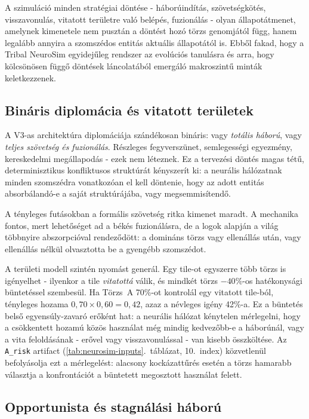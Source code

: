 ﻿\documentclass[a4paper,12pt]{report}
\begin{document}
A szimuláció minden stratégiai döntése - háborúindítás, szövetségkötés, visszavonulás,
vitatott területre való belépés, fuzionálás - olyan állapotátmenet, amelynek kimenetele
nem pusztán a döntést hozó törzs genomjától függ, hanem legalább annyira a szomszédos
entitás aktuális állapotától is. Ebből fakad, hogy a Tribal NeuroSim egyidejűleg
rendszer az evolúciós tanulásra és arra, hogy kölcsönösen függő döntések láncolatából
emergáló makroszintű minták keletkezzenek.

\subsection*{Bináris diplomácia és vitatott területek}

A V3-as architektúra diplomáciája szándékosan bináris: vagy \textit{totális háború},
vagy \textit{teljes szövetség és fuzionálás}. Részleges fegyverszünet, semlegességi
egyezmény, kereskedelmi megállapodás - ezek nem léteznek. Ez a tervezési döntés
magas tétű, determinisztikus konfliktusos struktúrát kényszerít ki: a neurális hálózatnak
minden szomszédra vonatkozóan el kell döntenie, hogy az adott entitás absorbálandó-e
a saját struktúrájába, vagy megsemmisítendő.

A tényleges futásokban a formális szövetség ritka kimenet maradt. A mechanika
fontos, mert lehetőséget ad a békés fuzionálásra, de a logok alapján a világ
többnyire abszorpcióval rendeződött: a domináns törzs vagy ellenállás után,
vagy ellenállás nélkül olvasztotta be a gyengébb szomszédot.

A területi modell szintén nyomást generál. Egy tile-ot egyszerre több törzs is igényelhet -
ilyenkor a tile \textit{vitatottá} válik, és mindkét törzs $-40\%$-os hatékonysági
büntetéssel szembesül. Ha Törzs~A 70\%-ot kontrolál egy vitatott tile-ból, tényleges
hozama $0{,}70 \times 0{,}60 = 0{,}42$, azaz a névleges igény 42\%-a. Ez a büntetés
belső egyensúly-zavaró erőként hat: a neurális hálózat kénytelen mérlegelni, hogy
a csökkentett hozamú közös használat még mindig kedvezőbb-e a háborúnál, vagy a
vita feloldásának - erővel vagy visszavonulással - van kisebb összköltése.
Az \texttt{A\_risk} artifact (\ref{tab:neurosim-inputs}.~táblázat, 10.~index)
közvetlenül befolyásolja ezt a mérlegelést: alacsony kockázattűrés esetén a törzs
hamarabb választja a konfrontációt a büntetett megosztott használat felett.

\subsection*{Opportunista és stagnálási háború}
\end{document}
